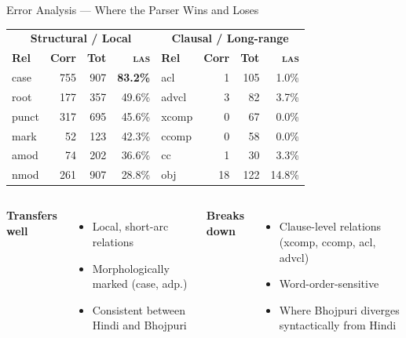 \documentclass[aspectratio=169,10pt]{beamer}
\newcommand{\bho}{Bhojpuri}
\newcommand{\hi}{Hindi}
\newcommand{\las}{\textsc{las}}
\begin{document}
\begin{frame}{Error Analysis --- Where the Parser Wins and Loses}
\centering
\small
\begin{tabular}{@{}lrrr @{\hspace{1cm}} lrrr@{}}
\toprule
\multicolumn{4}{c}{\textbf{Structural / Local}} & \multicolumn{4}{c}{\textbf{Clausal / Long-range}} \\
\textbf{Rel} & \textbf{Corr} & \textbf{Tot} & \textbf{\las{}} &
\textbf{Rel} & \textbf{Corr} & \textbf{Tot} & \textbf{\las{}} \\
\midrule
case    & 755 & 907   & \textbf{83.2\%} &  acl    &  1 & 105 & 1.0\% \\
root    & 177 & 357   & 49.6\% &  advcl  &  3 &  82 & 3.7\% \\
punct   & 317 & 695   & 45.6\% &  xcomp  &  0 &  67 & 0.0\% \\
mark    &  52 & 123   & 42.3\% &  ccomp  &  0 &  58 & 0.0\% \\
amod    &  74 & 202   & 36.6\% &  cc     &  1 &  30 & 3.3\% \\
nmod    & 261 & 907   & 28.8\% &  obj    & 18 & 122 & 14.8\% \\
\bottomrule
\end{tabular}

\vspace{0.5cm}
\begin{columns}[T]
\textbf{Transfers well}
\begin{itemize}\small
  \item Local, short-arc relations
  \item Morphologically marked (case, adp.)
  \item Consistent between \hi{} and \bho{}
\end{itemize}

\textbf{Breaks down}
\begin{itemize}\small
  \item Clause-level relations (xcomp, ccomp, acl, advcl)
  \item Word-order-sensitive
  \item Where \bho{} diverges syntactically from \hi{}
\end{itemize}
\end{columns}
\end{frame}
\end{document}
